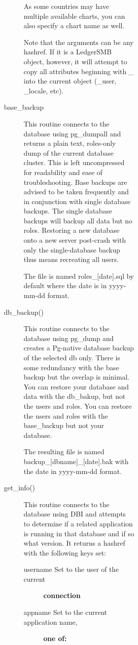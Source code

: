 \begin{description}
\begin{description}
\begin{description}
\begin{description}
\begin{description}
\begin{description}
\begin{description}
As some countries may have multiple available charts, you can also specify
a chart name as well.



Note that the arguments can be any hashref. If it is a LedgerSMB object,
however, it will attempt to copy all attributes beginning with \_ into the 
current object (\_user, \_locale, etc).


\item[{base\_backup}] \mbox{}

This routine connects to the database using pg\_dumpall and returns a plain text,
roles-only dump of the current database cluster.  This is left uncompressed for
readability and ease of troubleshooting.  Base backups are advised to be taken
frequently and in conjunction with single database backups.  The single database
backups will backup all data but no roles.  Restoring a new database onto a new
server post-crash with only the single-database backup thus means recreating all
users.



The file is named roles\_[date].sql by default where the date is in
yyyy-mm-dd format.


\item[{db\_backup()}] \mbox{}

This routine connects to the database using pg\_dump and creates a Pg-native 
database backup of the selected db only.  There is some redundancy with the base
backup but the overlap is minimal.  You can restore your database and data with
the db\_bakup, but not the users and roles.  You can restore the users and roles
with the base\_backup but not your database.



The resulting file is named backup\_[dbname]\_[date].bak with the date in
yyyy-mm-dd format.


\item[{get\_info()}] \mbox{}

This routine connects to the database using DBI and attempts to determine if a 
related application is running in that database and if so what version.  
It returns a hashref with the following keys set:

\begin{description}

\item[{username Set to the user of the current}] \textbf{connection}
\item[{appname Set to the current application name,}] \textbf{one of:}\begin{description}


\end{description}
\end{description}
\end{description}
\end{description}
\end{description}
\end{description}
\end{description}
\end{description}
\end{description}
